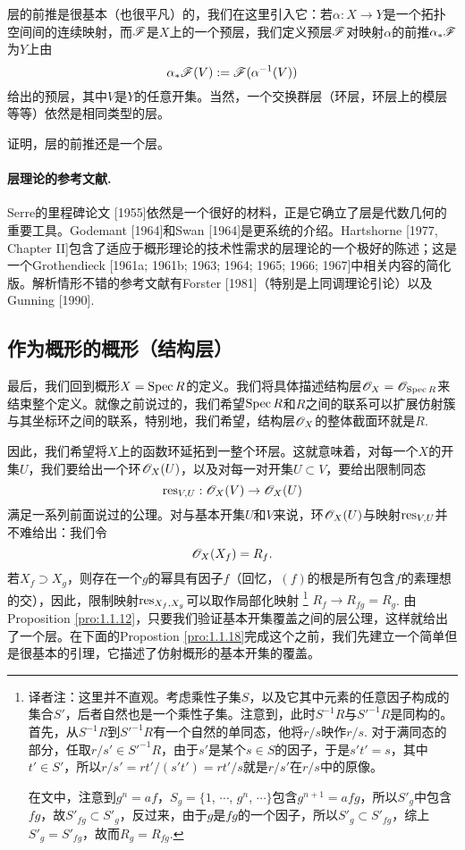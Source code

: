 层的前推是很基本（也很平凡）的，我们在这里引入它：若$\alpha:X\to Y$是一个拓扑空间间的连续映射，而$\mathscr{F}$是$X$上的一个预层，我们定义预层$\mathscr{F}$对映射$\alpha$的前推$\alpha_*\mathscr{F}$为$Y$上由
\[
	\alpha_*\mathscr{F}(V):=\mathscr{F}(\alpha^{-1}(V))
\]
给出的预层，其中$V$是$Y$的任意开集。当然，一个交换群层（环层，环层上的模层等等）依然是相同类型的层。

\begin{exe}
证明，层的前推还是一个层。
\end{exe}

\paragraph*{层理论的参考文献.}\label{ref:1} Serre的里程碑论文 [1955]依然是一个很好的材料，正是它确立了层是代数几何的重要工具。Godemant [1964]和Swan [1964]是更系统的介绍。Hartshorne [1977, Chapter II]包含了适应于概形理论的技术性需求的层理论的一个极好的陈述；这是一个Grothendieck [1961a; 1961b; 1963; 1964; 1965; 1966; 1967]中相关内容的简化版。解析情形不错的参考文献有Forster [1981]（特别是上同调理论引论）以及Gunning [1990].

\subsection{作为概形的概形（结构层）}

最后，我们回到概形$X=\operatorname{Spec} R$的定义。我们将具体描述结构层$\mathscr{O}_X=\mathscr{O}_{\operatorname{Spec} R}$来结束整个定义。就像之前说过的，我们希望$\operatorname{Spec} R$和$R$之间的联系可以扩展仿射簇与其坐标环之间的联系，特别地，我们希望，结构层$\mathscr{O}_X$的整体截面环就是$R$.

因此，我们希望将$X$上的函数环延拓到一整个环层。这就意味着，对每一个$X$的开集$U$，我们要给出一个环$\mathscr{O}_X(U)$，以及对每一对开集$U\subset V$，要给出限制同态
\[
	\operatorname{res}_{V,U}:\mathscr{O}_X(V)\to \mathscr{O}_X(U)
\]
满足一系列前面说过的公理。对与基本开集$U$和$V$来说，环$\mathscr{O}_X(U)$与映射$\operatorname{res}_{V,U}$并不难给出：我们令
\[
	\mathscr{O}_X(X_f)=R_f.
\]
若$X_f\supset X_g$，则存在一个$g$的幂具有因子$f$（回忆，$(f)$的根是所有包含$f$的素理想的交），因此，限制映射$\operatorname{res}_{X_f,X_g}$可以取作局部化映射
\footnote{译者注：这里并不直观。考虑乘性子集$S$，以及它其中元素的任意因子构成的集合$S'$，后者自然也是一个乘性子集。注意到，此时$S^{-1}R$与${S'}^{-1}R$是同构的。首先，从$S^{-1}R$到${S'}^{-1}R$有一个自然的单同态，他将$r/s$映作$r/s$. 对于满同态的部分，任取$r/s'\in {S'}^{-1}R$，由于$s'$是某个$s\in S$的因子，于是$s't'=s$，其中$t'\in S'$，所以$r/s'=rt'/(s't')=rt'/s$就是$r/s'$在$r/s$中的原像。

在文中，注意到$g^n=af$，$S_g=\{1$, $\cdots$, $g^n$, $\cdots\}$包含$g^{n+1}=afg$，所以$S'_g$中包含$fg$，故$S'_{fg}\subset S'_g$，反过来，由于$g$是$fg$的一个因子，所以$S'_g\subset S'_{fg}$，综上$S'_g=S'_{fg}$，故而$R_g=R_{fg}$.}
$R_f\to R_{fg}=R_g$. 由Proposition \ref{pro:1.1.12}，只要我们验证基本开集覆盖之间的层公理，这样就给出了一个层。在下面的Propostion \ref{pro:1.1.18}完成这个之前，我们先建立一个简单但是很基本的引理，它描述了仿射概形的基本开集的覆盖。

